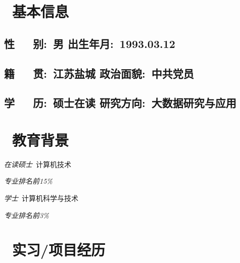 \documentclass{resume}
\begin{document}



\section{\faLightbulbO\  基本信息}

  \subsection{\hspace{0.2cm} \textbf{性\ \ \ 别}:\ 男 \hspace{6.97cm}      \textbf{出生年月}:\ 1993.03.12}
  \subsection{\hspace{0.2cm} \textbf{籍\ \ \ 贯}:\ 江苏盐城 \hspace{5.7cm} \textbf{政治面貌}:\ 中共党员}
  \subsection{\hspace{0.2cm} \textbf{学\ \ \ 历}:\ 硕士在读 \hspace{5.7cm} \textbf{研究方向}:\ 大数据研究与应用}
\medskip


\section{\faGraduationCap\  教育背景}
\textit{在读硕士}\ 计算机技术 \par
\textit{专业排名前15\%}

\textit{学士}\ 计算机科学与技术 \par
\textit{专业排名前3\%}
\medskip

\section{\faUsers\ 实习/项目经历}
\end{document}
